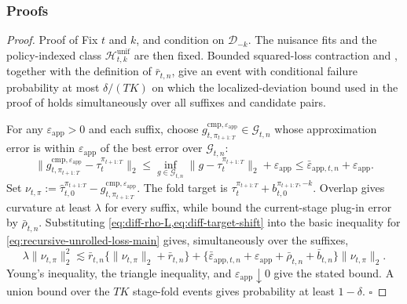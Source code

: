 \documentclass[opre,nonblindrev]{informs4}
\providecommand{\cD}{\mathcal D}
\providecommand{\cG}{\mathcal G}
\newcommand{\norm}[1]{\lVert#1\rVert}
\newcommand{\blipadv}{\tau}
\renewcommand{\qed}{\unskip\nobreak\hfill\ensuremath{\square}}
\begin{document}
\subsubsection{Proofs}

\begin{proof}{Proof of }
Fix $t$ and $k$, and condition on $\cD_{-k}$. The nuisance fits and the
policy-indexed class $\mathcal H_{t,k}^{\mathrm{unif}}$ are then fixed.
Bounded squared-loss contraction and
, together with the definition of
$\bar r_{t,n}$, give an event with conditional failure probability at most
$\delta/(TK)$ on which the localized-deviation bound used in the proof of
 holds simultaneously over all
suffixes and candidate pairs.

For any $\varepsilon_{\mathrm{app}}>0$ and each suffix, choose
$g_{t,\pi_{t+1:T}}^{\mathrm{cmp},\varepsilon_{\mathrm{app}}}\in\cG_{t,n}$ whose approximation
error is within $\varepsilon_{\mathrm{app}}$ of the best error over $\cG_{t,n}$:
\[
\norm{g_{t,\pi_{t+1:T}}^{\mathrm{cmp},\varepsilon_{\mathrm{app}}}
-\blipadv_t^{\pi_{t+1:T}}}_2
\leq
\inf_{g\in\cG_{t,n}}\norm{g-\blipadv_t^{\pi_{t+1:T}}}_2+\varepsilon_{\mathrm{app}}
\leq\bar\varepsilon_{\mathrm{app},t,n}+\varepsilon_{\mathrm{app}}.
\]
Set
$\nu_{t,\pi}:=\hat\blipadv_{t,0}^{\pi_{t+1:T}}
-g_{t,\pi_{t+1:T}}^{\mathrm{cmp},\varepsilon_{\mathrm{app}}}$.
The fold target is
$\blipadv_t^{\pi_{t+1:T}}+b_{t,0}^{\pi_{t+1:T},-k}$.
Overlap gives curvature at least $\lambda$ for every suffix, while
bound the current-stage plug-in error by $\bar\rho_{t,n}$.
Substituting \cref{eq:diff-rho-L,eq:diff-target-shift} into the basic
inequality for \cref{eq:recursive-unrolled-loss-main} gives, simultaneously
over the suffixes,
\[
\lambda\norm{\nu_{t,\pi}}_2^2
\lesssim \bar r_{t,n}
\{\norm{\nu_{t,\pi}}_2+\bar r_{t,n}\}
+\{\bar\varepsilon_{\mathrm{app},t,n}+\varepsilon_{\mathrm{app}}+\bar\rho_{t,n}+\bar b_{t,n}\}
\norm{\nu_{t,\pi}}_2.
\]
Young's inequality, the triangle inequality, and $\varepsilon_{\mathrm{app}}\downarrow0$ give the
stated bound. A union bound over the $TK$ stage-fold events gives probability
at least $1-\delta$.
\qed
\end{proof}
\end{document}
